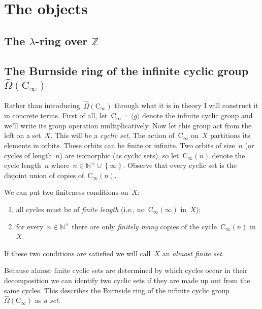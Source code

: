 \section{The objects}

\subsection{The $\lambda$-ring over $\mathbb{Z}$}


\subsection{The Burnside ring of the infinite cyclic group $\hat{\Omega}(\mathrm{C}_\infty)$}
Rather than introducing~$\hat{\Omega}(\mathrm{C}_\infty)$ through what it is in theory I will construct it in concrete terms. First of all, let~$\mathrm{C}_\infty=\langle g\rangle$ denote the infinite cyclic group and we'll write its group operation multiplicatively. Now let this group act from the left on a set~$X$. This will be a \emph{cyclic set}. The action of~$\mathrm{C}_\infty$ on~$X$ partitions its elements in orbits. These orbits can be finite or infinite. Two orbits of size~$n$ (or cycles of length~$n$) are isomorphic (as cyclic sets), so let~$\mathrm{C}_\infty(n)$ denote the cycle length~$n$ where~$n\in\mathbb{N}^\times\cup\left\{ \infty \right\}$. Observe that every cyclic set is the disjoint union of copies of~$\mathrm{C}_\infty(n)$.

We can put two finiteness conditions on~$X$:
\begin{enumerate}
  \item all cycles must be of \emph{finite length} (i.e., no~$\mathrm{C}_\infty(\infty)$ in~$X$);
  \item for every~$n\in\mathbb{N}^\times$ there are only \emph{finitely many} copies of the cycle~$\mathrm{C}_\infty(n)$ in~$X$.
\end{enumerate}
If these two conditions are satisfied we will call~$X$ an \emph{almost finite set}.

Because almost finite cyclic sets are determined by which cycles occur in their decomposition we can identify two cyclic sets if they are made up out from the same cycles. This describes the Burnside ring of the infinite cyclic group~$\hat{\Omega}(\mathrm{C}_\infty)$ as \emph{a set}.

